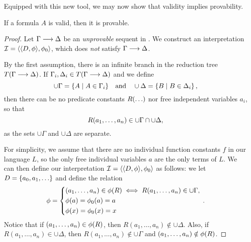 \documentclass[11pt,a4paper]{article}
\begin{document}
Equipped with this new tool, we may now show that validity implies provability.

\begin{theorem}\label{the:validity implies provability}
    If a formula \(A\) is valid, then it is provable.
\end{theorem}

\begin{proof}
    Let \(\Gamma\longrightarrow\Delta\) be an \emph{unprovable} sequent in \LK{}.
    We construct an interpretation \(\mathcal{I}=\langle\langle D,\phi\rangle,\phi_0\rangle\),
    which does \emph{not} satisfy \(\Gamma\longrightarrow\Delta\).

    By the first assumption, there is an infinite branch in
    the reduction tree \(T(\Gamma\longrightarrow\Delta)\).
    If \(\Gamma_i,\Delta_i\in T(\Gamma\longrightarrow\Delta)\) and we define
    \begin{equation*}
        \cup\Gamma = \{A \mid A\in\Gamma_i\}
        \quad\text{and}\quad
        \cup\Delta = \{B \mid B\in\Delta_i\}
        \,,
    \end{equation*}
    then there can be no predicate constants \(R(\ldots)\) nor
    free independent variables \(a_i\), so that
    \begin{equation*}
        R(a_1,\ldots,a_n)\in \cup\Gamma\cap\cup\Delta,
    \end{equation*}
    as the sets \(\cup\Gamma\) and \(\cup\Delta\) are separate.

    For simplicity, we assume that there are no individual
    function constants \(f\) in our language \(L\), so the only
    free individual variables \(a\) are the only terms of \(L\).
    We can then define our interpretation
    \(\mathcal{I}=\langle\langle D,\phi\rangle,\phi_0\rangle\) as follows:
    we let \(D = \{a_0,a_1,\ldots\}\) and define the relation
    \begin{equation*}
        \phi = \left\{
            \begin{aligned}
                &(a_1,\ldots,a_n)\in\phi(R) \iff R(a_1,\ldots,a_n)\in\cup\Gamma, \\
                &\phi(a) = \phi_0(a) = a \\
                &\phi(x) = \phi_0(x) = x \\
            \end{aligned}
        \right.\,.
    \end{equation*}
    Notice that if \((a_1,\ldots,a_n)\in\phi(R)\),
    then \( R(a_1,\ldots,a_n)\notin\cup\Delta\).
    Also, if \(R(a_1,\ldots,a_n)\in\cup\Delta\),
    then \( R(a_1,\ldots,a_n)\notin\cup\Gamma\) and
    \((a_1,\ldots,a_n)\notin\phi(R)\).


\end{proof}
\end{document}
